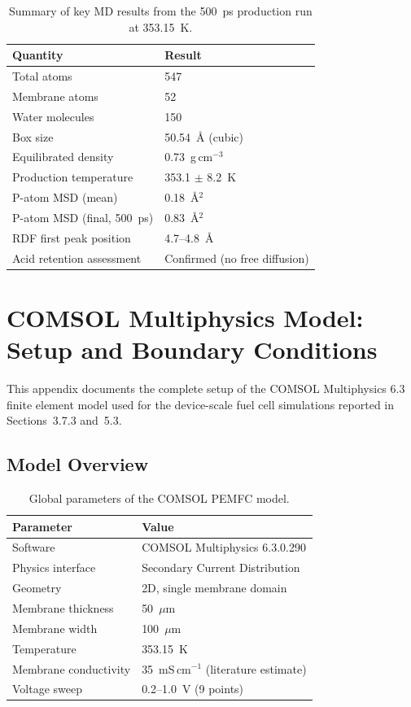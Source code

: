 \documentclass[12pt,a4paper]{report}
\begin{document}
\begin{table}[h]
\centering
\caption{Summary of key MD results from the 500~ps production 
run at 353.15~K.}
\label{tab:md-summary}
\begin{tabular}{ll}
\toprule
Quantity & Result \\
\midrule
Total atoms & 547 \\
Membrane atoms & 52 \\
Water molecules & 150 \\
Box size & 50.54~\AA{} (cubic) \\
Equilibrated density & 0.73~g\,cm\(^{-3}\) \\
Production temperature & 353.1 $\pm$ 8.2~K \\
P-atom MSD (mean) & 0.18~\AA\(^2\) \\
P-atom MSD (final, 500~ps) & 0.83~\AA\(^2\) \\
RDF first peak position & 4.7--4.8~\AA{} \\
Acid retention assessment & Confirmed (no free diffusion) \\
\bottomrule
\end{tabular}
\end{table}

\chapter{COMSOL Multiphysics Model: Setup and Boundary Conditions}

This appendix documents the complete setup of the COMSOL 
Multiphysics 6.3 finite element model used for the device-scale 
fuel cell simulations reported in Sections~3.7.3 and~5.3.

\section{Model Overview}

\begin{table}[h]
\centering
\caption{Global parameters of the COMSOL PEMFC model.}
\label{tab:comsol-global}
\begin{tabular}{ll}
\toprule
Parameter & Value \\
\midrule
Software & COMSOL Multiphysics 6.3.0.290 \\
Physics interface & Secondary Current Distribution \\
Geometry & 2D, single membrane domain \\
Membrane thickness & 50~\(\mu\)m \\
Membrane width & 100~\(\mu\)m \\
Temperature & 353.15~K \\
Membrane conductivity & 35~mS\,cm\(^{-1}\) (literature estimate) \\
Voltage sweep & 0.2--1.0~V (9 points) \\
\bottomrule
\end{tabular}
\end{table}
\end{document}
